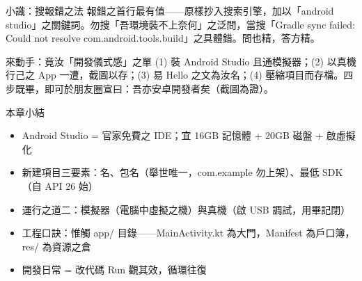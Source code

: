 \begin{tcbinfo}{小識：搜報錯之法}
報錯之首行最有值——原樣抄入搜索引擎，加以「android studio」之關鍵詞。勿搜「吾環境裝不上奈何」之泛問，當搜「Gradle sync failed: Could not resolve com.android.tools.build」之具體錯。問也精，答方精。

\end{tcbinfo}

\begin{tcbpractice}{來動手：竟汝「開發儀式感」之單}
(1) 裝 Android Studio 且通模擬器；(2) 以真機行己之 App 一遭，截圖以存；(3) 易 Hello 之文為汝名；(4) 壓縮項目而存檔。四步既畢，即可於朋友圈宣曰：吾亦安卓開發者矣（截圖為證）。

\end{tcbpractice}

\begin{tcbsummary}{本章小結}
\begin{itemize}
  \item Android Studio = 官家免費之 IDE；宜 16GB 記憶體 + 20GB 磁盤 + 啟虛擬化
  \item 新建項目三要素：名、包名（舉世唯一，com.example 勿上架）、最低 SDK（自 API 26 始）
  \item 運行之道二：模擬器（電腦中虛擬之機）與真機（啟 USB 調試，用畢記閉）
  \item 工程口訣：惟觸 app/ 目錄——MainActivity.kt 為大門，Manifest 為戶口簿，res/ 為資源之倉
  \item 開發日常 = 改代碼 Run 觀其效，循環往復
\end{itemize}

\end{tcbsummary}

